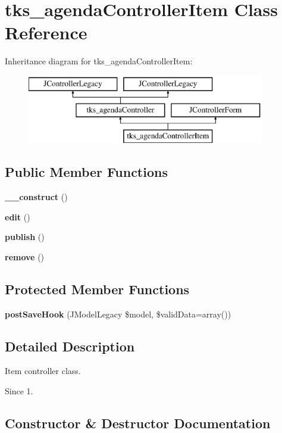 \section{tks\+\_\+agenda\+Controller\+Item Class Reference}
\label{classtks__agenda_controller_item}
Inheritance diagram for tks\+\_\+agenda\+Controller\+Item\+:\begin{figure}[H]
\begin{center}
\leavevmode
\includegraphics[height=3.000000cm]{classtks__agenda_controller_item}
\end{center}
\end{figure}
\subsection*{Public Member Functions}
\begin{DoxyCompactItemize}
\item 
\textbf{ \+\_\+\+\_\+construct} ()
\item 
\textbf{ edit} ()
\item 
\textbf{ publish} ()
\item 
\textbf{ remove} ()
\end{DoxyCompactItemize}
\subsection*{Protected Member Functions}
\begin{DoxyCompactItemize}
\item 
\textbf{ post\+Save\+Hook} (J\+Model\+Legacy \$model, \$valid\+Data=array())
\end{DoxyCompactItemize}


\subsection{Detailed Description}
Item controller class.

\begin{DoxySince}{Since}
1. 
\end{DoxySince}


\subsection{Constructor \& Destructor Documentation}
\mbox{\label{classtks__agenda_controller_item_a095c5d389db211932136b53f25f39685}} 
